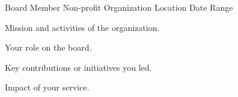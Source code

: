 \begin{cventries}
    \cventry
    {Board Member} %
    {Non-profit Organization} %
    {Location} %
    {Date Range} %
    {
      \begin{cvitems} %
        \item {Mission and activities of the organization.}
        \item {Your role on the board.}
        \item {Key contributions or initiatives you led.}
        \item {Impact of your service.}
      \end{cvitems}
    }
\end{cventries}

